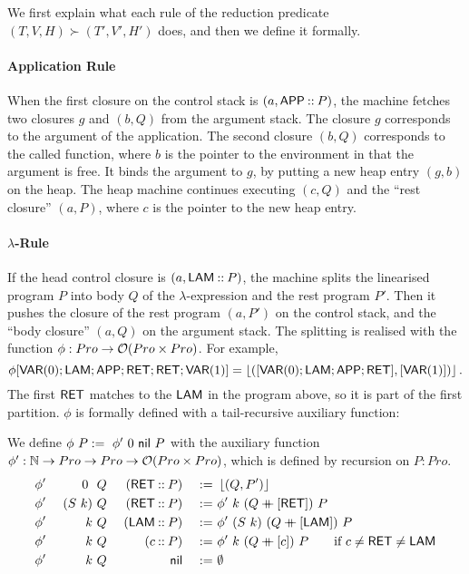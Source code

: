 We first explain what each rule of the reduction predicate $(T,V,H) \succ (T',V',H')$ does, and then we define it formally.


\paragraph{Application Rule}
When the first closure on the control stack is $(a, \mathsf{APP} \mathbin{::} P)$, the machine fetches two closures $g$ and $(b,Q)$ from the argument stack.  The
closure $g$ corresponds to the argument of the application.  The second closure $(b,Q)$ corresponds to the called function, where $b$ is the pointer
to the environment in that the argument is free.  It binds the argument to $g$, by putting a new heap entry $(g,b)$ on the heap.  The heap machine
continues executing $(c,Q)$ and the ``rest closure'' $(a,P)$, where $c$ is the pointer to the new heap entry.


\paragraph{$\lambda$-Rule}
If the head control closure is $(a, \mathsf{LAM} \mathbin{::} P)$, the machine splits the linearised program $P$ into body $Q$ of the $\lambda$-expression and
the rest program $P'$.  Then it pushes the closure of the rest program $(a,P')$ on the control stack, and the ``body closure'' $(a,Q)$ on the argument
stack.  The splitting is realised with the function $\phi : Pro \rightarrow \mathcal{O}(Pro \times Pro)$.  For example, {\small
  \[
    \phi[\mathsf{VAR}(0); \mathsf{LAM}; \mathsf{APP}; \mathsf{RET}; \mathsf{RET}; \mathsf{VAR}(1)] = \left\lfloor {([\ensuremath{\mathsf{VAR}}(0); \ensuremath{\mathsf{LAM}}; \ensuremath{\mathsf{APP}}; \ensuremath{\mathsf{RET}}], [\ensuremath{\mathsf{VAR}}(1)])} \right\rfloor.
  \]
}%
The first $\mathsf{RET}$ matches to the $\mathsf{LAM}$ in the program above, so it is part of the first partition.  $\phi$ is formally defined with a
tail-recursive auxiliary function:
\begin{definition}[$\phi$][jumpTarget]
  \label{def:jumpTarget}
  We define $\phi~P :=~ \phi'~0~\mathsf{nil}~P$ with the auxiliary function $\phi' : \mathbb{N} \rightarrow Pro \rightarrow Pro \rightarrow \mathcal{O}(Pro \times Pro)$, which is defined by
  recursion on $P:Pro$.
  \begin{alignat*}{4}
    &\phi'&~0~   &~Q&~(\mathsf{RET} \mathbin{::} P) &&~:=~& \left\lfloor {(Q,P')} \right\rfloor \\
    &\phi'&~(S~k)&~Q&~(\mathsf{RET} \mathbin{::} P) &&~:=~& \phi'~k~(Q \mathbin{+\mkern-10mu+} [\mathsf{RET}])~P \\
    &\phi'&~k    &~Q&~(\mathsf{LAM} \mathbin{::} P) &&~:=~& \phi'~(S~k)~(Q \mathbin{+\mkern-10mu+} [\mathsf{LAM}])~P \\
    &\phi'&~k    &~Q&~(c        \mathbin{::} P) &&~:=~& \phi'~k~(Q \mathbin{+\mkern-10mu+} [c])~P \qquad \text{if $c \neq \mathsf{RET} \neq \mathsf{LAM}$} \\
    &\phi'&~k    &~Q&~              \mathsf{nil} &&~:=~& \emptyset
  \end{alignat*}
\end{definition}


